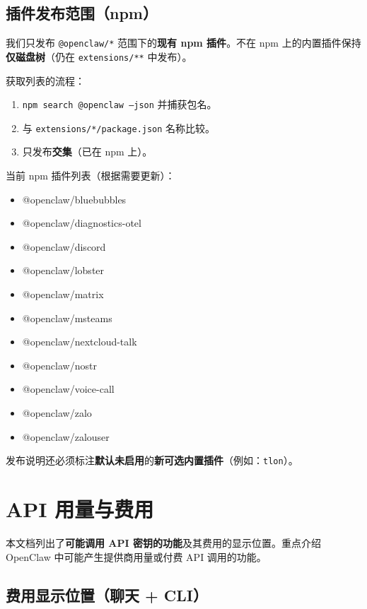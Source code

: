 \subsection{插件发布范围（npm）}


我们只发布 \texttt{@openclaw/*} 范围下的\textbf{现有 npm 插件}。不在 npm 上的内置插件保持\textbf{仅磁盘树}（仍在 \texttt{extensions/**} 中发布）。

获取列表的流程：

\begin{enumerate}
  \item \texttt{npm search @openclaw --json} 并捕获包名。
  \item 与 \texttt{extensions/*/package.json} 名称比较。
  \item 只发布\textbf{交集}（已在 npm 上）。
\end{enumerate}


当前 npm 插件列表（根据需要更新）：

\begin{itemize}
  \item @openclaw/bluebubbles
  \item @openclaw/diagnostics-otel
  \item @openclaw/discord
  \item @openclaw/lobster
  \item @openclaw/matrix
  \item @openclaw/msteams
  \item @openclaw/nextcloud-talk
  \item @openclaw/nostr
  \item @openclaw/voice-call
  \item @openclaw/zalo
  \item @openclaw/zalouser
\end{itemize}


发布说明还必须标注\textbf{默认未启用}的\textbf{新可选内置插件}（例如：\texttt{tlon}）。


\clearpage

\section{API 用量与费用}


本文档列出了\textbf{可能调用 API 密钥的功能}及其费用的显示位置。重点介绍 OpenClaw 中可能产生提供商用量或付费 API 调用的功能。

\subsection{费用显示位置（聊天 + CLI）}


